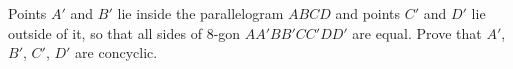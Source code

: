 Points $A'$ and $B'$ lie inside the parallelogram $ABCD$ and points $C'$ and $D'$ lie outside of it, so that all sides of 8-gon $AA'BB'CC'DD'$ are equal. Prove that $A'$, $B'$, $C'$, $D'$ are concyclic.